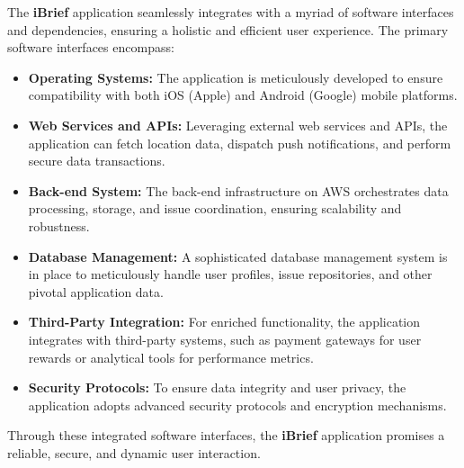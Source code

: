 The \textbf{iBrief} application seamlessly integrates with a myriad of software interfaces and dependencies, ensuring a holistic and efficient user experience. The primary software interfaces encompass:

\begin{itemize}
    \item \textbf{Operating Systems:} The application is meticulously developed to ensure compatibility with both \gls{iOS} (Apple) and \gls{Android} (Google) mobile platforms.
    
    \item \textbf{Web Services and \gls{API}s:} Leveraging external web services and \gls{API}s, the application can fetch location data, dispatch push notifications, and perform secure data transactions.
    
    \item \textbf{Back-end System:} The \gls{back-end} infrastructure on \gls{AWS} orchestrates data processing, storage, and issue coordination, ensuring \gls{scalability} and robustness.
    
    \item \textbf{Database Management:} A sophisticated database management system is in place to meticulously handle user profiles, issue repositories, and other pivotal application data.
    
    \item \textbf{Third-Party Integration:} For enriched functionality, the application integrates with third-party systems, such as payment gateways for user rewards or analytical tools for performance metrics.
    
    \item \textbf{Security Protocols:} To ensure data integrity and user privacy, the application adopts advanced security protocols and encryption mechanisms.
\end{itemize}

Through these integrated software interfaces, the \textbf{iBrief} application promises a reliable, secure, and dynamic user interaction.

